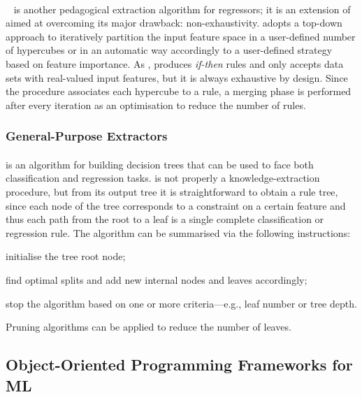 \documentclass[12pt,a4paper,openright,twoside]{book}
\begin{document}
\paragraph{\gridex}\label{par:gridex}

\gridex~\cite{gridex-extraamas2021} is another pedagogical extraction algorithm for regressors; it is an extension of \iter{} aimed at overcoming its major drawback: non-exhaustivity.
%
\gridex{} adopts a top-down approach to iteratively partition the input feature space in a user-defined number of hypercubes or in an automatic way accordingly to a user-defined strategy based on feature importance.
%
As \iter{}, \gridex{} produces \emph{if-then} rules and only accepts data sets with real-valued input features, but it is always exhaustive by design.
%
Since the procedure associates each hypercube to a rule, a merging phase is performed after every iteration as an optimisation to reduce the number of rules.

\subsubsection{General-Purpose Extractors}\label{ssec:generalpurpose}

\paragraph{\cart}\label{par:cart}

\cart{} \cite{breiman1984classification} is an algorithm for building decision trees that can be used to face both classification and regression tasks.
%
\cart{} is not properly a knowledge-extraction procedure, but from its output tree it is straightforward to obtain a rule tree, since each node of the \cart{} tree corresponds to a constraint on a certain feature and thus each path from the root to a leaf is a single complete classification or regression rule.
%
The algorithm can be summarised via the following instructions:
%
\begin{inlinelist}
    \item initialise the tree root node;
    \item find optimal splits and add new internal nodes and leaves accordingly;
    \item stop the algorithm based on one or more criteria---e.g., leaf number or tree depth.
\end{inlinelist}
%
Pruning algorithms can be applied to reduce the number of leaves.

\subsection[OOP Frameworks for ML]{Object-Oriented Programming Frameworks for ML}\label{ssec:smile}
\end{document}

